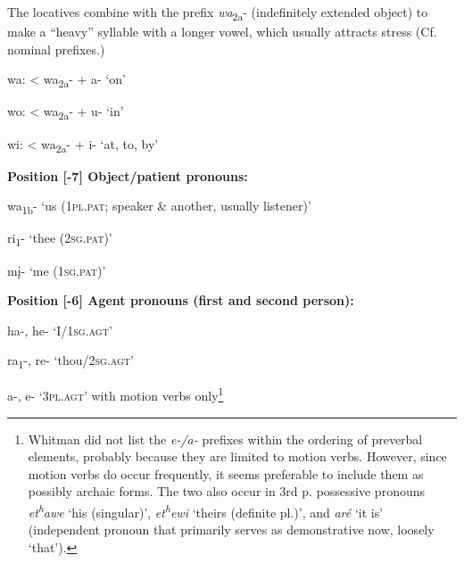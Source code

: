 \documentclass[output=paper]{LSP/langsci}
\begin{document}
\vspace{1em}		 	     	     
 The locatives combine with the prefix \textit{wa}\textsubscript{2a}- (indefinitely extended object) to make a ``heavy'' syllable with a longer vowel, which usually attracts stress (Cf. nominal prefixes.) 	      							

\vspace{1em}
\hspace{2em} wa:  < wa\textsubscript{2a}- + a-  `on'  	 							     	      		

\hspace{2em} wo:  < wa\textsubscript{2a}- + u-  `in'   									     		

\hspace{2em} wi:   < wa\textsubscript{2a}- + i-   `at, to, by'

\vspace{1em}
\textbf{Position [-7]  Object/patient pronouns:}

\hspace{2em} wa\textsubscript{1b}-    `us (\textsc{1pl.pat}; speaker \& another, usually listener)' 						      	   	   

\hspace{2em} ri\textsubscript{1}-       `thee (\textsc{2sg.pat})'								   	  	   

\hspace{2em} m\k{i}-      `me (\textsc{1sg.pat})'                         

\vspace{1em}
\textbf{Position [-6]  Agent pronouns (first and second person):} 	

\hspace{2em} ha-, he-  `I/\textsc{1sg.agt}'										

\hspace{2em} ra\textsubscript{1}-, re-   `thou/\textsc{2sg.agt}'				          	    			

\hspace{2em} a-, e- `\textsc{3pl.agt}'  with motion verbs only\footnote{Whitman did not list the \textit{e-/a-} prefixes within the ordering of preverbal elements, probably because they are limited to motion verbs. However, since motion verbs do occur frequently, it seems preferable to include them as possibly archaic forms. The two also occur in 3rd p. possessive pronouns \textit{et\textsuperscript{h}awe} `his (singular)', \textit{et\textsuperscript{h}ewi} `theirs (definite pl.)', and \textit{ar\'e} `it is' (independent pronoun that primarily serves as demonstrative now, loosely `that').} 	        	        
\end{document}

